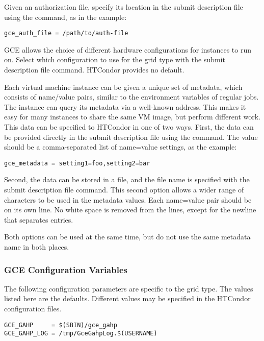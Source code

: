Given an authorization file, specify its location in
the submit description file using the  command,
as in the example:
\begin{verbatim}
gce_auth_file = /path/to/auth-file
\end{verbatim}

GCE allows the choice of different hardware configurations 
for instances to run on.
Select which configuration to use for the  grid type
with the  submit description file command.
HTCondor provides no default.

Each virtual machine instance can be given a unique set of metadata,
which consists of name/value pairs, similar to the environment variables
of regular jobs.
The instance can query its metadata via a well-known address.
This makes it easy for many instances to share the same VM image,
but perform different work.
This data can be specified to HTCondor in one of two ways.
First, the data can be provided directly in the submit description file 
using the  command.
The value should be a comma-separated list of name=value settings, 
as the example:
\begin{verbatim}
gce_metadata = setting1=foo,setting2=bar
\end{verbatim}

Second, the data can be stored in a file, 
and the file name is specified with the
 submit description file command.
This second option allows a wider range of characters to be used in the
metadata values.
Each name=value pair should be on its own line.
No white space is removed from the lines, except for the newline that
separates entries.

Both options can be used at the same time, 
but do not use the same metadata name in both places.

\subsubsection{\label{sec:Gce-config}GCE Configuration Variables}

The following configuration parameters are specific to the 
grid type. 
The values listed here are the defaults. 
Different values may be specified in the HTCondor configuration files.

\footnotesize
\begin{verbatim}
GCE_GAHP     = $(SBIN)/gce_gahp
GCE_GAHP_LOG = /tmp/GceGahpLog.$(USERNAME)
\end{verbatim}
\normalsize
